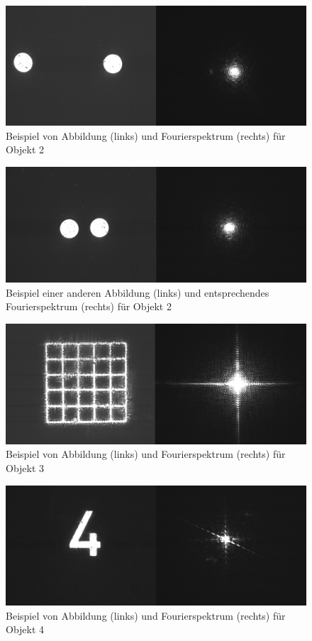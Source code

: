 \begin{figure}
\centering
\includegraphics[width=0.7\linewidth]{images/example2.png}
\caption{Beispiel von Abbildung (links) und Fourierspektrum (rechts) für Objekt 2}
\label{fig:example2}
\end{figure}

\begin{figure}
	\centering
	\includegraphics[width=0.7\linewidth]{images/example3.png}
	\caption{Beispiel einer anderen Abbildung (links) und entsprechendes Fourierspektrum (rechts) für Objekt 2}
	\label{fig:example3}
\end{figure}

\begin{figure}
\centering
\includegraphics[width=0.7\linewidth]{images/example13.png}
\caption{Beispiel von Abbildung (links) und Fourierspektrum (rechts) für Objekt 3}
\label{fig:example13}
\end{figure}

\begin{figure}
\centering
\includegraphics[width=0.7\linewidth]{images/example4.png}
\caption{Beispiel von Abbildung (links) und Fourierspektrum (rechts) für Objekt 4}
\label{fig:example4}
\end{figure}

